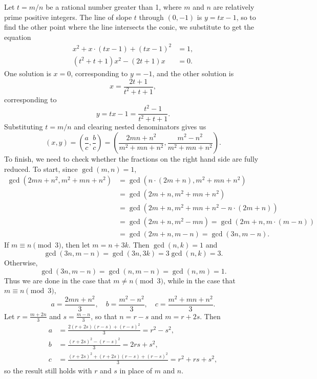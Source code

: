 \begin{enumerate}
\begin{enumerate}
Let $t = m/n$ be a rational number greater than 1, where $m$ and $n$ are relatively prime positive integers. The line of slope $t$ through $(0,-1)$ is $y = tx - 1$, so to find the other point where the line intersects the conic, we substitute to get the equation
\begin{align*}
x^2 + x\cdot (tx - 1) + (tx - 1)^2 &= 1, \\
(t^2 + t + 1)x^2 - (2t + 1)x &= 0.
\end{align*}
One solution is $x = 0$, corresponding to $y = -1$, and the other solution is
\begin{equation*}
x = \frac{2t + 1}{t^2 + t + 1},
\end{equation*}
corresponding to
\begin{equation*}
y = tx - 1 = \frac{t^2 - 1}{t^2 + t + 1}.
\end{equation*}
Substituting $t = m/n$ and clearing nested denominators gives us
\begin{equation*}
(x,y) = \left(\frac{a}{c},\frac{b}{c}\right) = \left(\frac{2mn + n^2}{m^2 + mn + n^2}, \frac{m^2 - n^2}{m^2 + mn + n^2}\right).
\end{equation*}
To finish, we need to check whether the fractions on the right hand side are fully reduced. To start, since $\gcd(m,n) = 1$,
\begin{align*}
\gcd(2mn + n^2, m^2 + mn + n^2) &= \gcd(n\cdot (2m + n), m^2 + mn + n^2) \\
&= \gcd(2m + n, m^2 + mn + n^2) \\
&= \gcd(2m + n, m^2 + mn + n^2 - n\cdot (2m + n)) \\
&= \gcd(2m + n, m^2 - mn) = \gcd(2m + n, m\cdot (m - n)) \\
&= \gcd(2m + n, m - n) = \gcd(3n, m - n).
\end{align*}
If $m\equiv n\pmod{3}$, then let $m = n + 3k$. Then $\gcd(n,k) = 1$ and
\begin{equation*}
\gcd(3n, m - n) = \gcd(3n,3k) = 3\gcd(n,k) = 3.
\end{equation*}
Otherwise,
\begin{equation*}
\gcd(3n, m - n) = \gcd(n, m - n) = \gcd(n,m) = 1.
\end{equation*}
Thus we are done in the case that $m\neq n\pmod{3}$, while in the case that $m\equiv n\pmod{3}$,
\begin{equation*}
a = \frac{2mn + n^2}{3},\quad b = \frac{m^2 - n^2}{3},\quad c = \frac{m^2 + mn + n^2}{3}.
\end{equation*}
Let $r = \frac{m + 2n}{3}$ and $s = \frac{m - n}{3}$, so that $n = r - s$ and $m = r + 2s$. Then
\begin{align*}
a &= \frac{2(r + 2s)(r - s) + (r - s)^2}{3} = r^2 - s^2, \\
b &= \frac{(r + 2s)^2 - (r - s)^2}{3} = 2rs + s^2, \\
c &= \frac{(r + 2s)^2 + (r + 2s)(r - s) + (r - s)^2}{3} = r^2 + rs + s^2,
\end{align*}
so the result still holds with $r$ and $s$ in place of $m$ and $n$.
\end{enumerate}
\end{enumerate}
